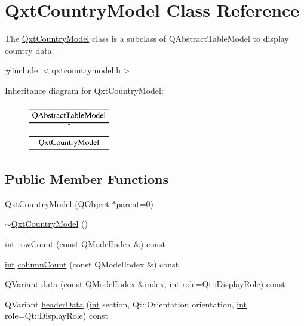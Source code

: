 \hypertarget{class_qxt_country_model}{\section{Qxt\-Country\-Model Class Reference}
\label{class_qxt_country_model}
}


The \hyperlink{class_qxt_country_model}{Qxt\-Country\-Model} class is a subclass of Q\-Abstract\-Table\-Model to display country data.  




{\ttfamily \#include $<$qxtcountrymodel.\-h$>$}

Inheritance diagram for Qxt\-Country\-Model\-:\begin{figure}[H]
\begin{center}
\leavevmode
\includegraphics[height=2.000000cm]{class_qxt_country_model}
\end{center}
\end{figure}
\subsection*{Public Member Functions}
\begin{DoxyCompactItemize}
\item 
\hyperlink{class_qxt_country_model_a92127cd7a491b4d49186a8fa251bb1f6}{Qxt\-Country\-Model} (Q\-Object $\ast$parent=0)
\item 
\hyperlink{class_qxt_country_model_aaa7d5e1487fb8802800142416df8f6fd}{$\sim$\-Qxt\-Country\-Model} ()
\item 
\hyperlink{ioapi_8h_a787fa3cf048117ba7123753c1e74fcd6}{int} \hyperlink{class_qxt_country_model_a4c4777c44986875a161f61699377b40c}{row\-Count} (const Q\-Model\-Index \&) const 
\item 
\hyperlink{ioapi_8h_a787fa3cf048117ba7123753c1e74fcd6}{int} \hyperlink{class_qxt_country_model_a8575309ebb749cf25d6e80d2f76772f1}{column\-Count} (const Q\-Model\-Index \&) const 
\item 
Q\-Variant \hyperlink{class_qxt_country_model_a6f1f6c93bfb96a4ec53173bf1a950fe9}{data} (const Q\-Model\-Index \&\hyperlink{glext_8h_ab47dd9958bcadea08866b42bf358e95e}{index}, \hyperlink{ioapi_8h_a787fa3cf048117ba7123753c1e74fcd6}{int} role=Qt\-::\-Display\-Role) const 
\item 
Q\-Variant \hyperlink{class_qxt_country_model_ad6e85c2370de2f6efa0e4f48c38ee1d6}{header\-Data} (\hyperlink{ioapi_8h_a787fa3cf048117ba7123753c1e74fcd6}{int} section, Qt\-::\-Orientation orientation, \hyperlink{ioapi_8h_a787fa3cf048117ba7123753c1e74fcd6}{int} role=Qt\-::\-Display\-Role) const 
\end{DoxyCompactItemize}


